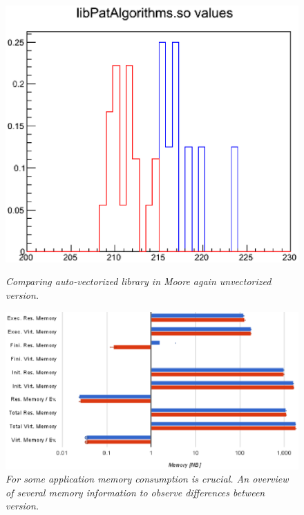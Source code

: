 \documentclass[a4paper]{jpconf}
\begin{document}
\begin{figure}[t]
\begin{minipage}[b]{0.33\textwidth}
\includegraphics[scale=0.3]{figures/moore_basic_vect.eps}
\caption{\small \textit{Comparing auto-vectorized library in Moore again unvectorized version.}}
\label{fig:moore_basic}
\end{minipage}\hspace{0.5cm}%
\begin{minipage}[b]{0.60\textwidth}
\centering
\includegraphics[scale=0.50]{figures/moore_overview_memory.eps}
\caption{\small \textit{For some application memory consumption is crucial. An overview of several memory information to observe differences between version.}}
\label{fig:moore_overview}
\end{minipage}
\end{figure}
\end{document}
